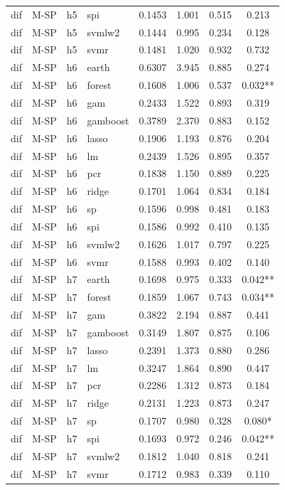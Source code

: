 \begin{ThreePartTable}
\begin{longtable}[t]{llclcccc}
dif & M-SP & h5 & spi & 0.1453 & 1.001 & 0.515 & 0.213\\
dif & M-SP & h5 & svmlw2 & 0.1444 & 0.995 & 0.234 & 0.128\\
dif & M-SP & h5 & svmr & 0.1481 & 1.020 & 0.932 & 0.732\\
\addlinespace
dif & M-SP & h6 & earth & 0.6307 & 3.945 & 0.885 & 0.274\\
dif & M-SP & h6 & forest & 0.1608 & 1.006 & 0.537 & 0.032**\\
dif & M-SP & h6 & gam & 0.2433 & 1.522 & 0.893 & 0.319\\
dif & M-SP & h6 & gamboost & 0.3789 & 2.370 & 0.883 & 0.152\\
dif & M-SP & h6 & lasso & 0.1906 & 1.193 & 0.876 & 0.204\\
dif & M-SP & h6 & lm & 0.2439 & 1.526 & 0.895 & 0.357\\
dif & M-SP & h6 & pcr & 0.1838 & 1.150 & 0.889 & 0.225\\
dif & M-SP & h6 & ridge & 0.1701 & 1.064 & 0.834 & 0.184\\
dif & M-SP & h6 & sp & 0.1596 & 0.998 & 0.481 & 0.183\\
dif & M-SP & h6 & spi & 0.1586 & 0.992 & 0.410 & 0.135\\
dif & M-SP & h6 & svmlw2 & 0.1626 & 1.017 & 0.797 & 0.225\\
dif & M-SP & h6 & svmr & 0.1588 & 0.993 & 0.402 & 0.140\\
\addlinespace
dif & M-SP & h7 & earth & 0.1698 & 0.975 & 0.333 & 0.042**\\
dif & M-SP & h7 & forest & 0.1859 & 1.067 & 0.743 & 0.034**\\
dif & M-SP & h7 & gam & 0.3822 & 2.194 & 0.887 & 0.441\\
dif & M-SP & h7 & gamboost & 0.3149 & 1.807 & 0.875 & 0.106\\
dif & M-SP & h7 & lasso & 0.2391 & 1.373 & 0.880 & 0.286\\
dif & M-SP & h7 & lm & 0.3247 & 1.864 & 0.890 & 0.447\\
dif & M-SP & h7 & pcr & 0.2286 & 1.312 & 0.873 & 0.184\\
dif & M-SP & h7 & ridge & 0.2131 & 1.223 & 0.873 & 0.247\\
dif & M-SP & h7 & sp & 0.1707 & 0.980 & 0.328 & 0.080*\\
dif & M-SP & h7 & spi & 0.1693 & 0.972 & 0.246 & 0.042**\\
dif & M-SP & h7 & svmlw2 & 0.1812 & 1.040 & 0.818 & 0.241\\
dif & M-SP & h7 & svmr & 0.1712 & 0.983 & 0.339 & 0.110\\

\end{longtable}
\end{ThreePartTable}
